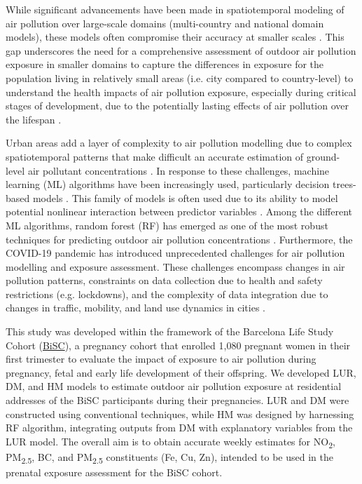 \documentclass{article}
\begin{document}
While significant advancements have been made in spatiotemporal modeling of air pollution over large-scale domains (multi-country and national domain models), these models often compromise their accuracy at smaller scales \cite{dehoogh2016, chen2019, chen2020, shen2022}. This gap underscores the need for a comprehensive assessment of outdoor air pollution exposure in smaller domains to capture the differences in exposure for the population living in relatively small areas (i.e. city compared to country-level) to understand the health impacts of air pollution exposure, especially during critical stages of development, due to the potentially lasting effects of air pollution over the lifespan \cite{selevan2000, wick2010, ghosh2021}.

Urban areas add a layer of complexity to air pollution modelling due to complex spatiotemporal patterns that make difficult an accurate estimation of ground-level air pollutant concentrations \cite{sokhi2022}. In response to these challenges, machine learning (ML) algorithms have been increasingly used, particularly decision trees-based models \cite{liu2022}. This family of models is often used due to its ability to model potential nonlinear interaction between predictor variables \cite{liu2022treebased}. Among the different ML algorithms, random forest (RF) has emerged as one of the most robust techniques for predicting outdoor air pollution concentrations \cite{chen2019, chen2020, stafoggia2019, stafoggia2020, schneider2020, mila2023}. Furthermore, the COVID-19 pandemic has introduced unprecedented challenges for air pollution modelling and exposure assessment. These challenges encompass changes in air pollution patterns, constraints on data collection due to health and safety restrictions (e.g. lockdowns), and the complexity of data integration due to changes in traffic, mobility, and land use dynamics in cities \cite{gonzalez2022, querol2021}. 
 
This study was developed within the framework of the Barcelona Life Study Cohort (\href{https://projectebisc.org/en/home/}{BiSC}), a pregnancy cohort that enrolled 1,080 pregnant women in their first trimester to evaluate the impact of exposure to air pollution during pregnancy, fetal and early life development of their offspring. We developed LUR, DM, and HM models to estimate outdoor air pollution exposure at residential addresses of the BiSC participants during their pregnancies. LUR and DM were constructed using conventional techniques, while HM was designed by harnessing RF algorithm, integrating outputs from DM with explanatory variables from the LUR model. The overall aim is to obtain accurate weekly estimates for NO\textsubscript{2}, PM\textsubscript{2.5}, BC, and PM\textsubscript{2.5} constituents (Fe, Cu, Zn), intended to be used in the prenatal exposure assessment for the BiSC cohort. 
\end{document}
